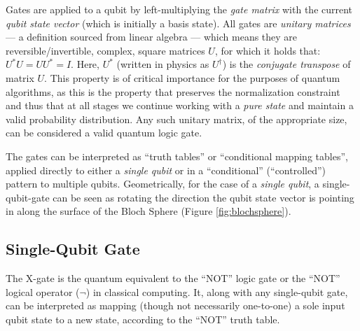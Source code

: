\documentclass[conference]{IEEEtran}
\begin{document}
Gates are applied to a qubit by left-multiplying the \textit{gate matrix} with the current \textit{qubit state vector} (which is initially a basis state).
All gates are \textit{unitary matrices} — a definition sourced from linear algebra —
which means they are reversible/invertible, complex, square matrices $U$,
for which it holds that: $U^*U=UU^*=I$.
Here, $U^*$ (written in physics as $U^\dagger$) is the \textit{conjugate transpose} of matrix $U$.
This property is of critical importance for the purposes of quantum algorithms,
as this is the property that preserves the normalization constraint and
thus that at all stages we continue working with a \textit{pure state} and maintain a valid probability distribution.
Any such unitary matrix, of the appropriate size, can be considered a valid quantum logic gate.

The gates can be interpreted as ``truth tables'' or ``conditional mapping tables'',
applied directly to either a \textit{single qubit} or in a ``conditional'' (``controlled'')
pattern to multiple qubits.
Geometrically, for the case of a \textit{single qubit}, a single-qubit-gate can be seen as rotating the
direction the qubit state vector is pointing in along the surface of the Bloch Sphere (Figure \ref{fig:blochsphere}).



\subsection{Single-Qubit Gate}
\label{sec:SingleQubitGate}

The X-gate is the quantum equivalent to the ``NOT'' logic gate or the ``NOT'' logical operator ($\neg$) in classical computing.
It, along with any single-qubit gate, can be interpreted as mapping (though not necessarily one-to-one) a sole input qubit state to a new state, according to the ``NOT'' truth table.
\end{document}
